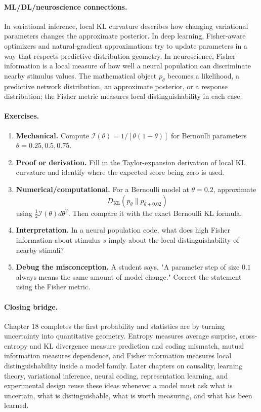 \paragraph{ML/DL/neuroscience connections.}
In variational inference, local KL curvature describes how changing variational parameters changes the approximate posterior. In deep learning, Fisher-aware optimizers and natural-gradient approximations try to update parameters in a way that respects predictive distribution geometry. In neuroscience, Fisher information is a local measure of how well a neural population can discriminate nearby stimulus values. The mathematical object \(p_\theta\) becomes a likelihood, a predictive network distribution, an approximate posterior, or a response distribution; the Fisher metric measures local distinguishability in each case.

\paragraph{Exercises.}
\begin{enumerate}[label=\textbf{18.4.\arabic*.}, leftmargin=*]
\item \textbf{Mechanical.} Compute \(\mathcal I(\theta)=1/[\theta(1-\theta)]\) for Bernoulli parameters \(\theta=0.25,0.5,0.75\).
\item \textbf{Proof or derivation.} Fill in the Taylor-expansion derivation of local KL curvature and identify where the expected score being zero is used.
\item \textbf{Numerical/computational.} For a Bernoulli model at \(\theta=0.2\), approximate
\[
D_{\mathrm{KL}}(p_\theta\|p_{\theta+0.02})
\]
using \(\frac12\mathcal I(\theta)d\theta^2\). Then compare it with the exact Bernoulli KL formula.
\item \textbf{Interpretation.} In a neural population code, what does high Fisher information about stimulus \(s\) imply about the local distinguishability of nearby stimuli?
\item \textbf{Debug the misconception.} A student says, "A parameter step of size \(0.1\) always means the same amount of model change." Correct the statement using the Fisher metric.
\end{enumerate}

\paragraph{Closing bridge.}
Chapter 18 completes the first probability and statistics arc by turning uncertainty into quantitative geometry. Entropy measures average surprise, cross-entropy and KL divergence measure prediction and coding mismatch, mutual information measures dependence, and Fisher information measures local distinguishability inside a model family. Later chapters on causality, learning theory, variational inference, neural coding, representation learning, and experimental design reuse these ideas whenever a model must ask what is uncertain, what is distinguishable, what is worth measuring, and what has been learned.

\clearpage
